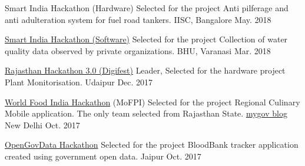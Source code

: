 


\begin{cvhonors}

  \cvhonor
    {Smart India Hackathon (Hardware)} %
	{Selected for the project Anti pilferage and anti adulteration system for fuel road tankers.} %
	{IISC, Bangalore} %
	{May. 2018} %

  \cvhonor
    {\href{https://drive.google.com/file/d/1pZPRlO3d-uHbwj0PD--kGmI6AiCMTnAV/view?usp=sharing}{Smart India Hackathon (Software)}} %
	{Selected for the project Collection of water quality data observed by private organizations.} %
	{BHU, Varanasi} %
	{Mar. 2018} %

  \cvhonor
    {\href{https://drive.google.com/drive/folders/1aT_wiJboLKDqXjuD8641xuNuK67zotdx?usp=sharing}{Rajasthan Hackathon 3.0 (Digifest)}} %
	{Leader, Selected for the hardware project Plant Monitorisation.} %
	{Udaipur} %
	{Dec. 2017} %

  \cvhonor
    {\href{https://drive.google.com/file/d/1m6jinRih9FB5npqilY9bRInptfyr0_eD/view?usp=sharing}{World Food India Hackathon} (MoFPI)} %
	{Selected for the project Regional Culinary Mobile application. The only team selected from Rajasthan State. \href{https://blog.mygov.in/announcing-shortlisted-entries-for-world-food-india-hackathon-2017-final-round/}{mygov blog}} %
	{New Delhi} %
	{Oct. 2017} %

  \cvhonor
    {\href{https://drive.google.com/file/d/1awN5B-bK9bPXvUSInTCRrdPGwepkewyC/view?usp=sharing}{OpenGovData Hackathon}} %
    {Selected for the project BloodBank tracker application created using government open data.} %
    {Jaipur} %
    {Oct. 2017} %


\end{cvhonors}

